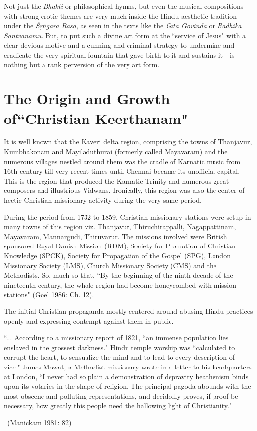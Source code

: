 Not just the \textit{Bhakti} or philosophical hymns, but even the musical compositions with strong erotic themes are very much inside the Hindu aesthetic tradition under the \textit{Śṛṅgāra Rasa}, as seen in the texts like the \textit{Gīta Govinda} or \textit{Rādhikā Sāntvanamu}. But, to put such a divine art form at the ``service of Jesus" with a clear devious motive and a cunning and criminal strategy to undermine and eradicate the very spiritual fountain that gave birth to it and sustains it - is nothing but a rank perversion of the very art form.

\vspace{-.3cm}

\section*{The Origin and Growth of\hfill \break ``Christian Keerthanam"}

It is well known that the Kaveri delta region, comprising the towns of Thanjavur, Kumbhakonam and Mayiladuthurai (formerly called Mayavaram) and the numerous villages nestled around them was the cradle of Karnatic music from 16th century till very recent times until Chennai became its unofficial capital. This is the region that produced the Karnatic Trinity and numerous great composers and illustrious Vidwans. Ironically, this region was also the center of hectic Christian missionary activity during the very same period.

During the period from 1732 to 1859, Christian missionary stations were setup in many towns of this region viz. Thanjavur, Thiruchirappalli, Nagappattinam, Mayavaram, Mannargudi, Thiruvarur. The missions involved were British sponsored Royal Danish Mission (RDM), Society for Promotion of Christian Knowledge (SPCK), Society for Propagation of the Gospel (SPG), London Missionary Society (LMS), Church Missionary Society (CMS) and the Methodists. So, much so that, ``By the beginning of the ninth decade of the nineteenth century, the whole region had become honeycombed with mission stations" (Goel 1986: Ch. 12).

The initial Christian propaganda mostly centered around abusing Hindu practices openly and expressing contempt against them in public.

\begin{myquote}
``... According to a missionary report of 1821, ``an immense population lies enslaved in the grossest darkness." Hindu temple worship was ``calculated to corrupt the heart, to sensualize the mind and to lead to every description of vice." James Mowat, a Methodist missionary wrote in a letter to his headquarters at London, ``I never had so plain a demonstration of depravity heathenism binds upon its votaries in the shape of religion. The principal pagoda abounds with the most obscene and polluting representations, and decidedly proves, if proof be necessary, how greatly this people need the hallowing light of Christianity." 

~\hfill (Manickam 1981: 82)
\end{myquote}

